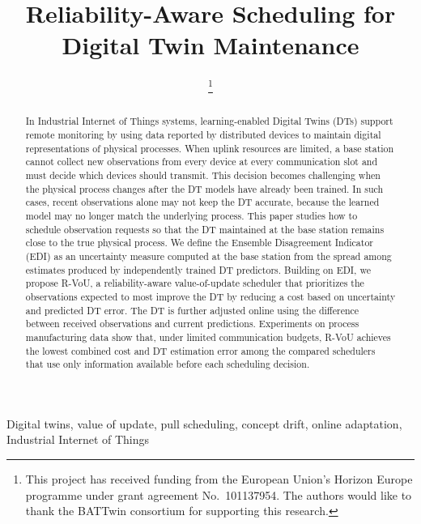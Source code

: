 \documentclass[conference]{IEEEtran}
\begin{document}
\title{Reliability-Aware Scheduling for\\
Digital Twin Maintenance}

\author{
\thanks{This project has received funding from the European Union's Horizon Europe programme under grant agreement No.~101137954. The authors would like to thank the BATTwin consortium for supporting this research.}
}


\maketitle

\begin{abstract}
In Industrial Internet of Things systems, learning-enabled Digital Twins
(DTs) support remote monitoring by using data reported by distributed devices
to maintain digital representations of physical processes. When uplink
resources are limited, a base station cannot collect new observations from
every device at every communication slot and must decide which devices should transmit. This
decision becomes challenging when the physical process changes after the DT
models have already been trained. In such cases, recent observations alone may not keep
the DT accurate, because the learned model may no longer match the underlying
process.
This paper studies how to schedule observation requests so that the DT
maintained at the base station remains close to the true physical process. We
define the Ensemble Disagreement Indicator (EDI) as an uncertainty measure computed at
the base station from the spread among estimates produced by independently
trained DT predictors. Building on EDI, we propose R-VoU, a reliability-aware
value-of-update scheduler that prioritizes the observations expected to most
improve the DT by reducing a cost based on uncertainty and predicted DT error. The DT is further adjusted online using the
difference between received observations and current predictions. Experiments on process manufacturing data show that, under limited
communication budgets, R-VoU achieves the lowest combined cost and DT
estimation error among the compared schedulers that use only information
available before each scheduling decision.
\end{abstract}

\begin{IEEEkeywords}
Digital twins, value of update, pull scheduling,
concept drift, online adaptation, Industrial Internet of Things
\end{IEEEkeywords}
\vspace{-1.70mm}
\end{document}
